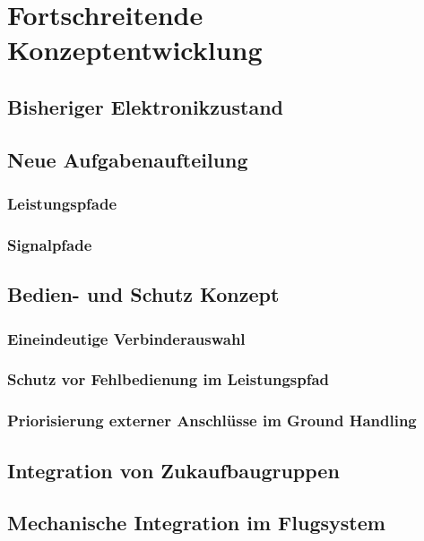\chapter{Fortschreitende Konzeptentwicklung}\label{cha:Konzeptenwicklung}

\section{Bisheriger Elektronikzustand}

\section{Neue Aufgabenaufteilung}

\subsection{Leistungspfade}

\subsection{Signalpfade}

\section{Bedien- und Schutz Konzept}

\subsection{Eineindeutige Verbinderauswahl}

\subsection{Schutz vor Fehlbedienung im Leistungspfad}

\subsection{Priorisierung externer Anschlüsse im Ground Handling}

\section{Integration von Zukaufbaugruppen}

\section{Mechanische Integration im Flugsystem}